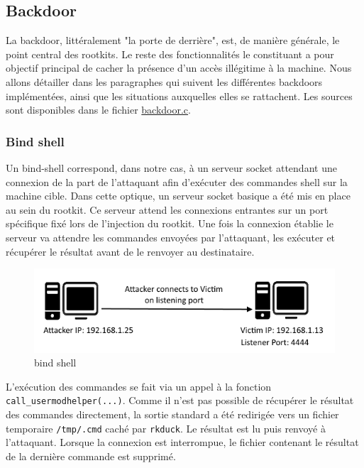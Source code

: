 \documentclass[12pt]{article}
\begin{document}
    \subsection{Backdoor}

        La backdoor, littéralement "la porte de derrière", est, de manière générale, le point central des rootkits. Le reste des fonctionnalités le constituant a pour objectif principal de cacher la présence d'un accès illégitime à la machine. Nous allons détailler dans les paragraphes qui suivent les différentes backdoors implémentées, ainsi que les situations auxquelles elles se rattachent. Les sources sont disponibles dans le fichier \href{https://github.com/QuokkaLight/rkduck/blob/master/rkduck/backdoor.c}{backdoor.c}.
    
        \subsubsection{Bind shell}
            
            Un bind-shell correspond, dans notre cas, à un serveur socket attendant une connexion de la part de l'attaquant afin d'exécuter des commandes shell sur la machine cible. Dans cette optique, un serveur socket basique a été mis en place au sein du rootkit. Ce serveur attend les connexions entrantes sur un port spécifique fixé lors de l'injection du rootkit. Une fois la connexion établie le serveur va attendre les commandes envoyées par l'attaquant, les exécuter et récupérer le résultat avant de le renvoyer au destinataire.
            
\begin{figure}[H] 
\begin{center}
\includegraphics{./img/bind-shell.png}

\caption[dsfsdf]{bind shell}
\end{center}
\end{figure}
            
            L'exécution des commandes se fait via un appel à la fonction \texttt{ call\_usermodhelper(...)}. Comme il n'est pas possible de récupérer le résultat des commandes directement, la sortie standard a été redirigée vers un fichier temporaire \texttt{/tmp/.cmd} caché par \texttt{rkduck}. Le résultat est lu puis renvoyé à l'attaquant. Lorsque la connexion est interrompue, le fichier contenant le résultat de la dernière commande est supprimé.
            
\end{document}

